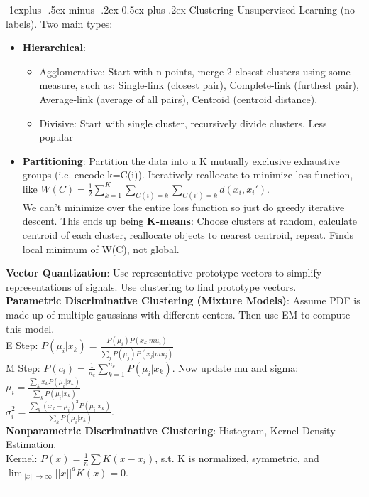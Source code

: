 \documentclass[3pt,landscape]{article}
\makeatletter
\renewcommand{\subsection}{\@startsection{subsection}{2}{0mm}%
                            {-1explus -.5ex minus -.2ex}%
                            {0.5ex plus .2ex}%
                            {\normalfont\normalsize\bfseries}}
\makeatother
\begin{document}
\begin{multicols}{3}
\subsection{Clustering}
Unsupervised Learning (no labels). Two main types:
\begin{itemize}
	\item {\bf Hierarchical}:
	\begin{itemize}
		\item Agglomerative: Start with n points, merge 2 closest clusters using some measure, such as: Single-link (closest pair), Complete-link (furthest pair), Average-link (average of all pairs), Centroid (centroid distance).
		\item Divisive: Start with single cluster, recursively divide clusters. Less popular
	\end{itemize}
	\item {\bf Partitioning}: Partition the data into a K mutually exclusive exhaustive groups (i.e. encode k=C(i)). Iteratively reallocate to minimize loss function, like $W(C)=\frac{1}{2} \sum_{k=1}^K \sum_{C(i)=k} \sum_{C(i')=k} d(x_i, x_i')$. 
	\\We can't minimize over the entire loss function so just do greedy iterative descent. This ends up being {\bf K-means}: Choose clusters at random, calculate centroid of each cluster, reallocate objects to nearest centroid, repeat. Finds local minimum of W(C), not global.
\end{itemize}
{\bf Vector Quantization}: Use representative prototype vectors to simplify representations of signals. Use clustering to find prototype vectors.
\\{\bf Parametric Discriminative Clustering (Mixture Models)}: Assume PDF is made up of multiple gaussians with different centers. Then use EM to compute this model. 
\\E Step: $P(\mu_i | x_k) = \frac{P(\mu_i) P(x_k | mu_i)}{\sum_j P(\mu_j) P(x_j|mu_j)}$
\\M Step: $P(c_i) = \frac{1}{n_e} \sum_{k=1}^{n_e} P(\mu_i | x_k)$. Now update mu and sigma:\\$\mu_i = \frac{\sum_k x_k P(\mu_i|x_k)}{\sum_k P(\mu_i | x_k)}$
	\\$\sigma_i^2=\frac{\sum_k (x_k-\mu_i)^2 P(\mu_i|x_k)}{\sum_k P(\mu_i | x_k)}$.
\\{\bf Nonparametric Discriminative Clustering}: Histogram, Kernel Density Estimation. 
\\Kernel: $P(x) = \frac{1}{n} \sum K(x-x_i)$, s.t. K is normalized, symmetric, and $\lim_{||x|| \rightarrow \infty} ||x||^d K(x) = 0$.

\rule{0.3\linewidth}{0.25pt}
\newpage
\scriptsize


\end{multicols}
\end{document}
